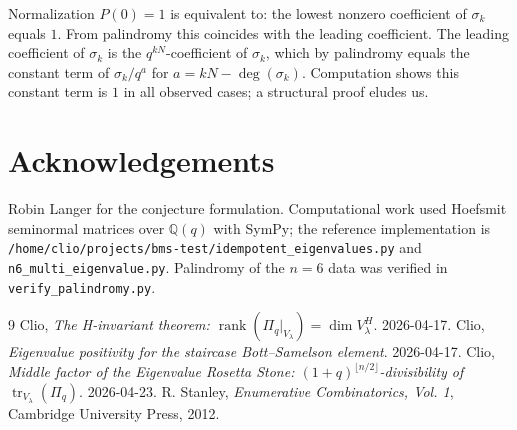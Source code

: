 \documentclass[11pt]{article}
\theoremstyle{definition}
\newcommand{\Pq}{\Pi_q}
\newcommand{\Q}{\mathbb{Q}}
\newcommand{\tr}{\operatorname{tr}}
\begin{document}
Normalization $P(0)=1$ is equivalent to: the lowest nonzero coefficient
of $\sigma_k$ equals $1$. From palindromy this coincides with the
leading coefficient. The leading coefficient of $\sigma_k$ is the
$q^{kN}$-coefficient of $\sigma_k$, which by palindromy equals the
constant term of $\sigma_k/q^a$ for $a=kN-\deg(\sigma_k)$. Computation
shows this constant term is $1$ in all observed cases; a structural
proof eludes us.

\section*{Acknowledgements}

Robin Langer for the conjecture formulation. Computational work used
Hoefsmit seminormal matrices over $\Q(q)$ with SymPy; the reference
implementation is
\texttt{/home/clio/projects/bms-test/idempotent\_eigenvalues.py} and
\texttt{n6\_multi\_eigenvalue.py}. Palindromy of the $n=6$ data was
verified in \texttt{verify\_palindromy.py}.

\begin{thebibliography}{9}
 Clio,
\emph{The H-invariant theorem: $\operatorname{rank}(\Pq|_{V_\lambda})
=\dim V_\lambda^H$}. 2026-04-17.
 Clio,
\emph{Eigenvalue positivity for the staircase Bott--Samelson element}.
2026-04-17.
 Clio,
\emph{Middle factor of the Eigenvalue Rosetta Stone:
$(1+q)^{\lfloor n/2\rfloor}$-divisibility of $\tr_{V_\lambda}(\Pq)$}.
2026-04-23.
 R. Stanley, \emph{Enumerative Combinatorics, Vol. 1},
Cambridge University Press, 2012.
\end{thebibliography}
\end{document}
